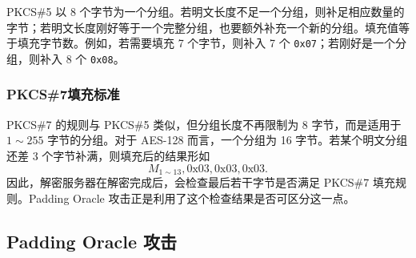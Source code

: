 PKCS\#5 以 8 个字节为一个分组。若明文长度不足一个分组，则补足相应数量的字节；若明文长度刚好等于一个完整分组，也要额外补充一个新的分组。填充值等于填充字节数。例如，若需要填充 7 个字节，则补入 7 个 \texttt{0x07}；若刚好是一个分组，则补入 8 个 \texttt{0x08}。

\subsubsection{PKCS\#7填充标准}

PKCS\#7 的规则与 PKCS\#5 类似，但分组长度不再限制为 8 字节，而是适用于 $1\sim255$ 字节的分组。对于 AES-128 而言，一个分组为 16 字节。若某个明文分组还差 3 个字节补满，则填充后的结果形如
\[
    M_{1\sim13},\text{0x03},\text{0x03},\text{0x03}.
\]
因此，解密服务器在解密完成后，会检查最后若干字节是否满足 PKCS\#7 填充规则。Padding Oracle 攻击正是利用了这个检查结果是否可区分这一点。

\subsection{Padding Oracle 攻击}

